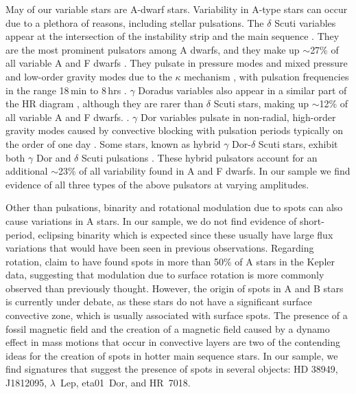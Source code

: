 \documentclass[twocolumn]{aastex631}
\begin{document}
May of our variable stars are A-dwarf stars.  Variability in A-type stars can occur due to a plethora of reasons, including stellar pulsations.  The $\delta$ Scuti variables appear at the intersection of the instability strip and the main sequence \citep[e.g.,][]{Petit1987}.  They are the most prominent pulsators among A dwarfs, and they make up $\sim$27\% of all variable A and F dwarfs \citep{Uytterhoeven2011}.   They pulsate in pressure modes and mixed pressure and low-order gravity modes due to the $\kappa$ mechanism \citep{Lee1985}, with pulsation frequencies in the range 18\,min to 8\,hrs \citep{Amado2004}. $\gamma$ Doradus variables also appear in a similar part of the HR diagram \citep[e.g.,][]{Kaye1999}, although they are rarer than $\delta$ Scuti stars, making up $\sim$12\% of all variable A and F dwarfs. \citep{Uytterhoeven2011}. $\gamma$ Dor variables pulsate in non-radial, high-order gravity modes caused by convective blocking \citep{Guzik2000} with pulsation periods typically on the order of one day \citep{Grigahcene2010}.  Some stars, known as hybrid $\gamma$ Dor-$\delta$ Scuti stars, exhibit both $\gamma$ Dor and $\delta$ Scuti pulsations \citep{Grigahcene2010}.  These hybrid pulsators account for an additional $\sim$23\% of all variability found in A and F dwarfs. In our sample we find evidence of all three types of the above pulsators at varying amplitudes.

Other than pulsations, binarity and rotational modulation due to spots can also cause variations in A stars. In our sample, we do not find evidence of short-period, eclipsing binarity which is expected since these usually have large flux variations that would have been seen in previous observations. Regarding rotation, \citet{Balona2013, Balona2017} claim to have found spots in more than 50\% of A stars in the Kepler data, suggesting that modulation due to surface rotation is more commonly observed than previously thought. However, the origin of spots in A and B stars is currently under debate, as these stars do not have a significant surface convective zone, which is usually associated with surface spots. The presence of a fossil magnetic field \citep{Parker1955} and the creation of a magnetic field caused by a dynamo effect in mass motions that occur in convective layers \citep{Charbonneau2014} are two of the contending ideas for the creation of spots in hotter main sequence stars. In our sample, we find signatures that suggest the presence of spots in several objects:  HD 38949, J1812095, $\lambda$~Lep, eta01~Dor, and HR~7018.
\end{document}
